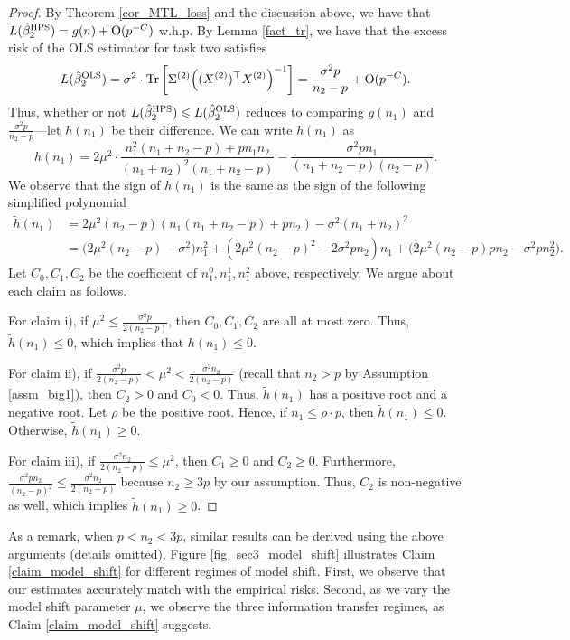 \begin{proof}
By Theorem \ref{cor_MTL_loss} and the discussion above, we have that $L(\hat{\beta}_2^{\textup{HPS}}) = g(n) + \operatorname{O}(p^{-C})$ w.h.p.
By Lemma \ref{fact_tr}, we have that the excess risk of the OLS estimator for task two satisfies
\begin{align*}
    L(\hat{\beta}_2^{\STL})
    = \sigma^2 \cdot \bigtr{\Sigma^{(2)}\Big((X^{(2)})^{\top} X^{(2)} \Big)^{-1}}
    = \frac{\sigma^2 p}{n_2 - p} + \OO(p^{-C}).
\end{align*}
Thus, whether or not $L(\hat{\beta}_2^{\textup{HPS}}) \leqslant L(\hat{\beta}_2^{\textup{OLS}})$ reduces to comparing $g(n_1)$ and $\frac{\sigma^2 p}{n_2 - p}$---let $h(n_1)$ be their difference.
We can write $h(n_1)$ as
\[ h(n_1) = 2\mu^2 \cdot \frac{n_1^2 (n_1 + n_2 - p) + p n_1 n_2}{(n_1 + n_2)^2 (n_1 + n_2 - p)} - \frac{\sigma^2 p n_1}{(n_1 + n_2 - p)(n_2 - p)}. \]
We observe that the sign of $h(n_1)$ is the same as the sign of the following simplified polynomial
\begin{align*}
    \tilde h(n_1) &= 2\mu^2 (n_2 - p) (n_1 (n_1 + n_2 - p) + p n_2) - \sigma^2 (n_1 + n_2)^2 \\
    &= \big(2\mu^2 (n_2 - p) - \sigma^2\big) n_1^2 + (2\mu^2 (n_2 - p)^2 - 2\sigma^2 p n_2) n_1 + \big(2\mu^2 (n_2 - p) p n_2 - \sigma^2 p n_2^2\big).
\end{align*}
Let $C_0, C_1, C_2$ be the coefficient of $n_1^0, n_1^1, n_1^2$ above, respectively.
We argue about each claim as follows.

For claim i), if $\mu^2 \le \frac{\sigma^2 p}{2(n_2 - p)}$, then $C_0, C_1, C_2$ are all at most zero.
Thus, $\tilde h(n_1) \le 0$, which implies that $h(n_1) \le 0$.

For claim ii), if $\frac{\sigma^2 p}{2(n_2 - p)}< \mu^2 < \frac{\sigma^2 n_2}{2(n_2 - p)}$ (recall that $n_2 > p$ by Assumption \ref{assm_big1}), then $C_2 > 0$ and $C_0 < 0$.
Thus, $\tilde{h}(n_1)$ has a positive root and a negative root.
Let $\rho$ be the positive root.
Hence, if $n_1 \le \rho \cdot p$, then $\tilde h(n_1) \le 0$.
Otherwise, $\tilde h(n_1) \ge 0$.

For claim iii), if $\frac{\sigma^2 n_2}{2(n_2 - p)} \le \mu^2$, then $C_1 \ge 0$ and $C_2 \ge 0$.
Furthermore, $\frac{\sigma^2 p n_2}{(n_2 - p)^2} \le \frac{\sigma^2 n_2}{2(n_2 - p)}$ because $n_2 \ge 3p$ by our assumption.
Thus, $C_2$ is non-negative as well, which implies $\tilde h(n_1) \ge 0$.
\end{proof}


As a remark, when $p < n_2 < 3p$, similar results can be derived using the above arguments (details omitted).
Figure \ref{fig_sec3_model_shift} illustrates Claim \ref{claim_model_shift} for different regimes of model shift.
First, we observe that our estimates accurately match with the empirical risks.
Second, as we vary the model shift parameter $\mu$, we observe the three information transfer regimes, as Claim \ref{claim_model_shift} suggests.





